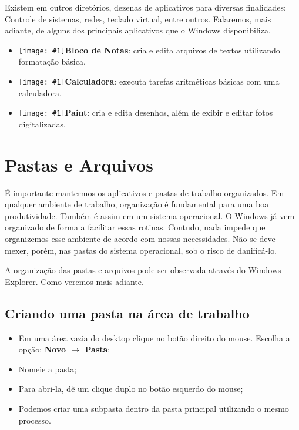 \documentclass[hidelinks,12pt]{article}
\newcommand{\icon}[1]{\texttt{[image: \#1]}}
\begin{document}
Existem em outros diretórios, dezenas de aplicativos para diversas finalidades: Controle de sistemas, redes, teclado virtual, entre outros. Falaremos, mais adiante, de alguns dos principais aplicativos que o Windows disponibiliza.

\begin{itemize}
	\item{
		{\icon{Figures/bloco_notas}\bf Bloco de Notas}: cria e edita arquivos de textos utilizando formatação básica.
		
		}

	\item{
		{\icon{Figures/calculadora}\bf Calculadora}: executa tarefas aritméticas básicas com uma calculadora.
		
		}

	\item{
		{\icon{Figures/paint}\bf Paint}: cria e edita desenhos, além de exibir e editar fotos digitalizadas.
		}
\end{itemize}

\section{Pastas e Arquivos}

É importante mantermos os aplicativos e pastas de trabalho organizados. Em qualquer ambiente de trabalho, organização é fundamental para uma boa produtividade. Também é assim em um sistema operacional. O Windows já vem organizado de forma a facilitar essas rotinas. Contudo, nada impede que organizemos esse ambiente de acordo com nossas necessidades. Não se deve mexer, porém, nas pastas do sistema operacional, sob o risco de danificá-lo.

A organização das pastas e arquivos pode ser observada através do Windows Explorer. Como veremos mais adiante.

\subsection{Criando uma pasta na área de trabalho}

\begin{itemize}
	\item Em uma área vazia do desktop clique no botão direito do mouse. Escolha a opção: {\bf Novo   $\rightarrow $ Pasta};
	\item Nomeie a pasta;
	\item Para abri-la, dê um clique duplo no botão esquerdo do mouse;
	\item Podemos criar uma subpasta dentro da pasta principal utilizando o mesmo processo.
\end{itemize}
\end{document}
